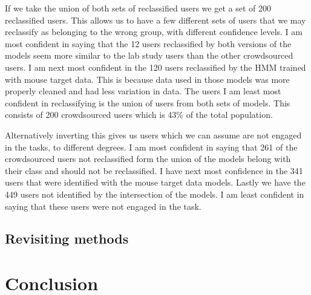 \documentclass{article}
\begin{document}
If we take the union of both sets of reclassified users we get a set of 200 reclassified users.
This allows us to have a few different sets of users that we may reclassify as belonging to the wrong group, with different confidence levels.
I am most confident in saying that the 12 users reclassified by both versions of the models seem more similar to the lab study users than the other crowdsourced users.
I am next most confident in the 120 users reclassified by the HMM trained with mouse target data.
This is because data used in those models was more properly cleaned and had less variation in data.
The users I am least most confident in reclassifying is the union of users from both sets of models.
This consists of 200 crowdsourced users which is 43\% of the total population.

Alternatively inverting this gives us users which we can assume are not engaged in the tasks, to different degrees.
I am most confident in saying that 261 of the crowdsourced users not reclassified form the union of the models belong with their class and should not be reclassified.
I have next most confidence in the 341 users that were identified with the mouse target data models.
Lastly we have the 449 users not identified by the intersection of the models.
I am least confident in saying that these users were not engaged in the task.


\subsection{Revisiting methods}


\section{Conclusion}
\end{document}
